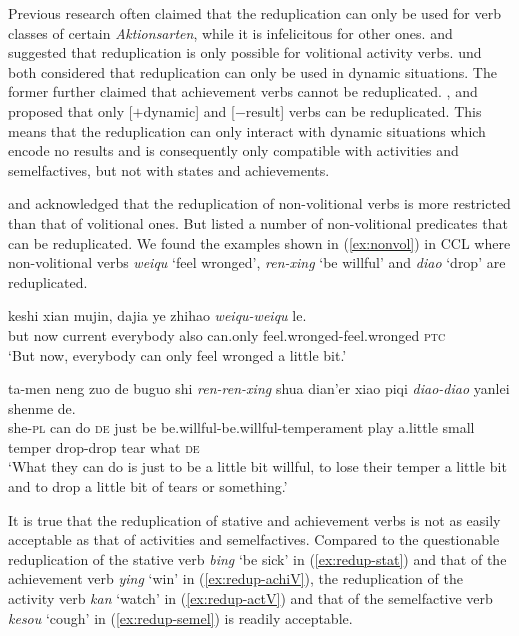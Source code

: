 Previous research often claimed that the reduplication can only be used for verb classes of certain \textit{Aktionsarten}, while it is infelicitous for other ones.
 \citet[234--235]{LiThompson1981} and \citet[277--278]{Hong1999} suggested that reduplication is only possible for volitional activity verbs.
\citet[70--71]{Dai1997} und \citet[290]{Tsao2001} both considered that reduplication can only be used in dynamic situations.
The former further claimed that achievement verbs cannot be reduplicated.
 \citet[155]{XiaoMcEnery2004}, \citet[20]{Arcodiaetal2014} and \citet[145]{BascianoMelloni2017} proposed that only [$+$dynamic] and [$-$result] verbs can be reduplicated.
This means that the reduplication can only interact with dynamic situations which encode no results and is consequently only compatible with activities and semelfactives, but not with states and achievements.

\citet[53]{Chen2001} and \citet[10--11]{Yang2003} acknowledged that the reduplication of non\hyp{}vo\-li\-tion\-al verbs is more restricted than that of volitional ones.
But \citet[381--382]{Zhu1998} listed a number of non\hyp{}volitional predicates that can be reduplicated.
We found the examples shown in (\ref{ex:nonvol}) in {CCL} where non\nobreakdash-vo\-li\-tion\-al verbs \textit{weiqu} `feel wronged', \textit{ren-xing} `be willful' and \textit{diao} `drop' are reduplicated.

\settowidth{}

\begin{sloppypar}
\ea\label{ex:nonvol}
\ea
\gll keshi xian mujin, dajia ye zhihao \textit{weiqu-weiqu} le.\\
but now current everybody also can.only feel.wronged-feel.wronged \textsc{ptc}\\ 
\glt `But now, everybody can only feel wronged a little bit.'

\ex
\gll ta-men neng zuo de buguo shi \textit{ren-ren-xing} shua dian'er xiao piqi \textit{diao-diao} yanlei shenme de.\\
she-\textsc{pl} can do \textsc{de} just be be.willful-be.willful-temperament play a.little small temper drop-drop tear what \textsc{de}\\ 
\glt `What they can do is just to be a little bit willful, to lose their temper a little bit and to drop a little bit of tears or something.'
\z
\z
\end{sloppypar}

It is true that  the reduplication of stative and achievement verbs is not as easily acceptable as that of activities and semelfactives.
Compared to the questionable reduplication of the stative verb \textit{bing} `be sick' in (\ref{ex:redup-stat})
and that of the achievement verb \textit{ying} `win' in (\ref{ex:redup-achiV}), 
the reduplication of the activity verb \textit{kan} `watch' in (\ref{ex:redup-actV})
and that of the semelfactive verb \textit{kesou} `cough' in (\ref{ex:redup-semel}) is readily acceptable.

